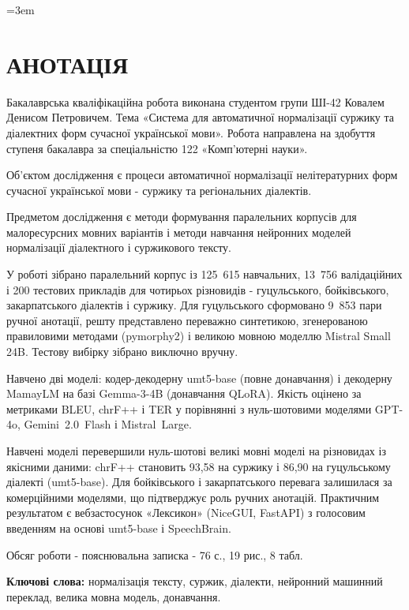 \documentclass[14pt]{extarticle}
\let\oldaddcontentsline\addcontentsline
\renewcommand{\addcontentsline}[3]{\phantomsection\oldaddcontentsline{#1}{#2}{#3}}
\begin{document}
\setcounter{page}{4}

\sloppy
\emergencystretch=3em
\section*{АНОТАЦІЯ}

Бакалаврська кваліфікаційна робота виконана студентом групи ШІ-42 Ковалем Денисом Петровичем. Тема «Система для автоматичної нормалізації суржику та діалектних форм сучасної української мови». Робота направлена на здобуття ступеня бакалавра за спеціальністю 122 «Комп'ютерні науки».

Об'єктом дослідження є процеси автоматичної нормалізації нелітературних форм сучасної української мови - суржику та регіональних діалектів.

Предметом дослідження є методи формування паралельних корпусів для малоресурсних мовних варіантів і методи навчання нейронних моделей нормалізації діалектного і суржикового тексту.

У роботі зібрано паралельний корпус із 125~615 навчальних, 13~756 валідаційних і 200 тестових прикладів для чотирьох різновидів - гуцульського, бойківського, закарпатського діалектів і суржику. Для гуцульського сформовано 9~853 пари ручної анотації, решту представлено переважно синтетикою, згенерованою правиловими методами (pymorphy2) і великою мовною моделлю Mistral Small 24B. Тестову вибірку зібрано виключно вручну.

Навчено дві моделі: кодер-декодерну umt5-base (повне донавчання) і декодерну MamayLM на базі Gemma-3-4B (донавчання QLoRA). Якість оцінено за метриками BLEU, chrF++ і TER у порівнянні з нуль-шотовими моделями GPT-4o, Gemini~2.0~Flash і Mistral~Large.

Навчені моделі перевершили нуль-шотові великі мовні моделі на різновидах із якісними даними: chrF++ становить 93,58 на суржику і 86,90 на гуцульському діалекті (umt5-base). Для бойківського і закарпатського перевага залишилася за комерційними моделями, що підтверджує роль ручних анотацій. Практичним результатом є вебзастосунок «Лексикон» (NiceGUI, FastAPI) з голосовим введенням на основі umt5-base і SpeechBrain.

Обсяг роботи - пояснювальна записка - 76 с., 19 рис., 8 табл.

\textbf{Ключові слова:} нормалізація тексту, суржик, діалекти, нейронний машинний переклад, велика мовна модель, донавчання.
\end{document}
